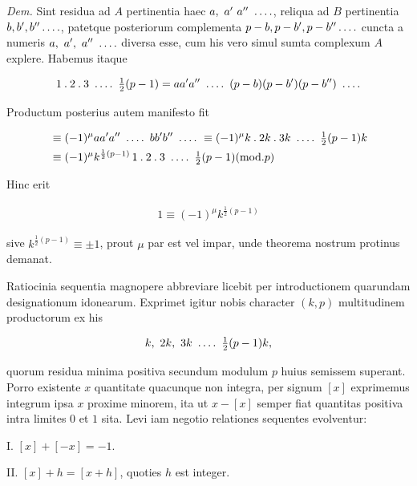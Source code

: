 \emph{Dem.}  Sint residua ad $A$ pertinentia haec $a,\ a'\ a''\ \dotsfour$, reliqua ad $B$ pertinentia $b,b',b''\mathinner{.\,.\,.\,.}$, patetque posteriorum complementa $p-b,p-b',p-b''\mathinner{.\,.\,.\,.}$ cuncta a numeris $a,\ a',\ a''\ \mathinner{.\,.\,.\,.}$ diversa esse, cum his vero simul sumta complexum $A$ explere.  Habemus itaque

\[
\begin{aligned}
1\pdot2\pdot3\ \dotsfour\ \tfrac12(p-1)=aa' a''\ \dotsfour\ (p-b)(p-b')(p-b'')\ \dotsfour
\end{aligned}
\]

Productum posterius autem manifesto fit

\[
\begin{aligned}
&\equiv(-1)^\mu aa' a''\ \dotsfour\ bb' b''\ \dotsfour\ \equiv(-1)^\mu k\pdot2k\pdot3k\ \dotsfour\ \tfrac12(p-1)k\\
&\equiv(-1)^\mu k^{\frac12(p-1)}\,1\pdot2\pdot3\ \dotsfour\ \tfrac12(p-1) (\mathrm{mod.}p)
\end{aligned}
\]

Hinc erit

\[
\begin{aligned}
1\equiv(-1)^\mu k^{\frac12(p-1)}
\end{aligned}
\]

sive $k^{\frac12(p-1)}\equiv\pm1$, prout $\mu$ par est vel impar, unde theorema nostrum protinus demanat.


Ratiocinia sequentia magnopere abbreviare licebit per introductionem quarundam designationum idonearum.  Exprimet igitur nobis character $(k,p)$ multitudinem productorum ex his

\[
\begin{aligned}
k,\ 2k,\ 3k\ \mathinner{.\,.\,.\,.}\ \tfrac12(p-1)k,
\end{aligned}
\]

quorum residua minima positiva secundum modulum $p$ huius semissem superant. Porro existente $x$ quantitate quacunque non integra, per signum $[x]$ exprimemus integrum ipsa $x$ proxime minorem, ita ut $x-[x]$ semper fiat quantitas positiva intra limites $0$ et $1$ sita.  Levi iam negotio relationes sequentes evolventur:

I.  $[x]+[-x]=-1.$

II.  $[x]+h=[x+h]$, quoties $h$ est integer.

